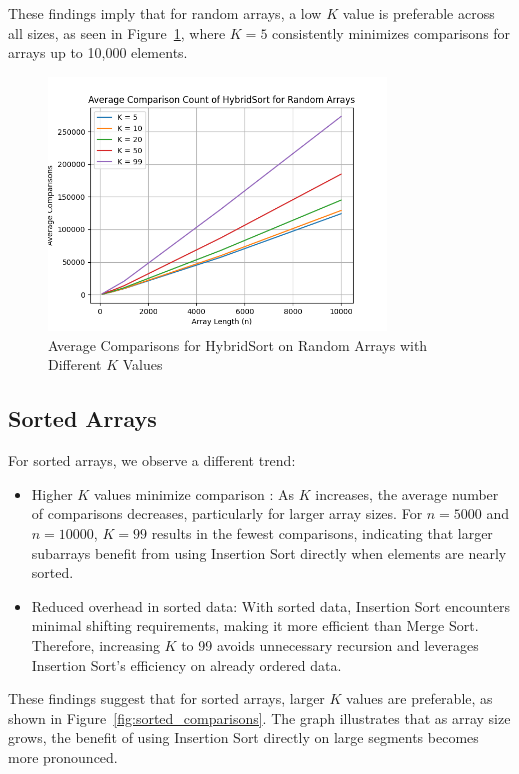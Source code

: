 \documentclass{article}
\begin{document}
These findings imply that for random arrays, a low \( K \) value is preferable across all sizes, as seen in Figure~\ref{fig:random_comparisons}, where \( K = 5 \) consistently minimizes comparisons for arrays up to 10,000 elements.

\begin{figure}[!ht]
    \centering
    \includegraphics[width=0.8\textwidth]{../average_comparisons_random.png}
    \caption{Average Comparisons for HybridSort on Random Arrays with Different \( K \) Values}\label{fig:random_comparisons}
\end{figure}

\subsection{Sorted Arrays}
For sorted arrays, we observe a different trend:
\begin{itemize}
    \item Higher \( K \) values minimize comparison : As \( K \) increases, the average number of comparisons decreases, particularly for larger array sizes. For \( n = 5000 \) and \( n = 10000 \), \( K = 99 \) results in the fewest comparisons, indicating that larger subarrays benefit from using Insertion Sort directly when elements are nearly sorted.
    \item Reduced overhead in sorted data: With sorted data, Insertion Sort encounters minimal shifting requirements, making it more efficient than Merge Sort. Therefore, increasing \( K \) to 99 avoids unnecessary recursion and leverages Insertion Sort’s efficiency on already ordered data.
\end{itemize}

These findings suggest that for sorted arrays, larger \( K \) values are preferable, as shown in Figure~\ref{fig:sorted_comparisons}. The graph illustrates that as array size grows, the benefit of using Insertion Sort directly on large segments becomes more pronounced.
\end{document}
